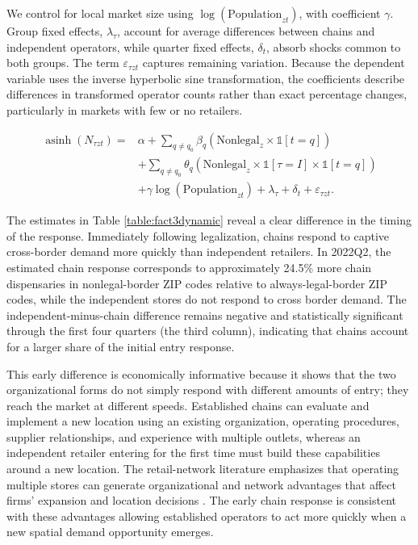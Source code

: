 \documentclass[english,12pt]{article}
\begin{document}
We control for local market size using $\log(\text{Population}_{zt})$, with coefficient $\gamma$. Group fixed effects, $\lambda_\tau$, account for average differences between chains and independent operators, while quarter fixed effects, $\delta_t$, absorb shocks common to both groups. The term $\varepsilon_{\tau zt}$ captures remaining variation. Because the dependent variable uses the inverse hyperbolic sine transformation, the coefficients describe differences in transformed operator counts rather than exact percentage changes, particularly in markets with few or no retailers.

\begin{equation}
\label{type_reg}
\begin{aligned}
\operatorname{asinh}(N_{\tau zt})
={}&
\alpha
+
\sum_{q \neq q_0}
\beta_q
\left(
\text{Nonlegal}_{z}
\times
\mathbb{1}[t=q]
\right)
\\
&+
\sum_{q \neq q_0}
\theta_q
\left(
\text{Nonlegal}_{z}
\times
\mathbb{1}[\tau=I]
\times
\mathbb{1}[t=q]
\right)
\\
&+
\gamma \log(\text{Population}_{zt})
+
\lambda_{\tau}
+
\delta_t
+
\varepsilon_{\tau zt}.
\end{aligned}
\end{equation}





The estimates in Table \ref{table:fact3dynamic} reveal a clear difference in the timing of the response. Immediately following legalization, chains respond to captive cross-border demand more quickly than independent retailers. In 2022Q2, the estimated chain response corresponds to approximately 24.5\% more chain dispensaries in nonlegal-border ZIP codes relative to always-legal-border ZIP codes, while the independent stores do not respond to cross border demand. The independent-minus-chain difference remains negative and statistically significant through the first four quarters (the third column), indicating that chains account for a larger share of the initial entry response.

This early difference is economically informative because it shows that the two organizational forms do not simply respond with different amounts of entry; they reach the market at different speeds. Established chains can evaluate and implement a new location using an existing organization, operating procedures, supplier relationships, and experience with multiple outlets, whereas an independent retailer entering for the first time must build these capabilities around a new location. The retail-network literature emphasizes that operating multiple stores can generate organizational and network advantages that affect firms' expansion and location decisions \citep{EllicksonHoughtonTimmins2013,Holmes2011}. The early chain response is consistent with these advantages allowing established operators to act more quickly when a new spatial demand opportunity emerges.
\end{document}
